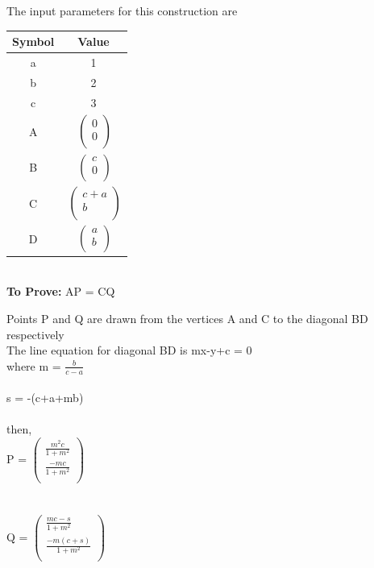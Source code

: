 \documentclass[10pt, a4paper]{article}
\begin{document}
The input parameters for this construction are 
\begin{center}
\begin{tabular}{|c|c|}
	\hline
	\textbf{Symbol}&\textbf{Value}\\
	\hline
	a&1\\
	\hline
	b&2\\
	\hline
	c&3\\
	\hline

	A&$\
	\begin{pmatrix}
		0 \\
		0 \\
	\end{pmatrix}$%
	\\
	\hline
	B&$\
	\begin{pmatrix}
		c \\
		0 \\
	\end{pmatrix}$%
	\\
	\hline
	C&$\
	\begin{pmatrix}
		c+a \\
		b \\
	\end{pmatrix}$%
	\\
	\hline
	D&$\
	\begin{pmatrix}
		a \\
		b\\
	\end{pmatrix}$%
	\\
	\hline
\end{tabular}
\end{center}
\
\\
\textbf{To Prove:} AP = CQ
		\begin{center}
		Points P and Q are drawn from the vertices A and C to the diagonal BD respectively\\
		The line equation for diagonal BD is mx-y+c = 0\\
		where m = $\frac{b}{c-a}$\\
		\
		\\
		s = -(c+a+mb)\\
		\
		\\
		then,\\
		P =  $\begin{pmatrix}
		\frac{m^2c}{1+m^2} \\
		\frac{-mc}{1+m^2} \\
	\end{pmatrix}$
	\\
	\
	\\
	\
	\\
	Q =  $\begin{pmatrix}
		\frac{mc-s}{1+m^2} \\ 
		\frac{-m(c+s)}{1+m^2} \\
	\end{pmatrix}$
	\\
	\end{center}
	
\end{document}
